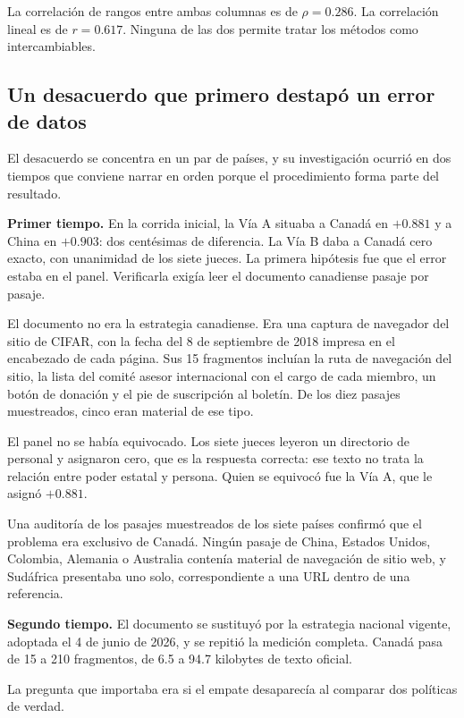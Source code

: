 La correlación de rangos entre ambas columnas es de $\rho = 0.286$. La correlación lineal es de $r = 0.617$. Ninguna de las dos permite tratar los métodos como intercambiables.

\subsection{Un desacuerdo que primero destapó un error de datos}
\label{sec:defecto-canada}

El desacuerdo se concentra en un par de países, y su investigación ocurrió en dos tiempos que conviene narrar en orden porque el procedimiento forma parte del resultado.

\textbf{Primer tiempo.} En la corrida inicial, la Vía A situaba a Canadá en $+0.881$ y a China en $+0.903$: dos centésimas de diferencia. La Vía B daba a Canadá cero exacto, con unanimidad de los siete jueces. La primera hipótesis fue que el error estaba en el panel. Verificarla exigía leer el documento canadiense pasaje por pasaje.

El documento no era la estrategia canadiense. Era una captura de navegador del sitio de CIFAR, con la fecha del 8 de septiembre de 2018 impresa en el encabezado de cada página. Sus 15 fragmentos incluían la ruta de navegación del sitio, la lista del comité asesor internacional con el cargo de cada miembro, un botón de donación y el pie de suscripción al boletín. De los diez pasajes muestreados, cinco eran material de ese tipo.

El panel no se había equivocado. Los siete jueces leyeron un directorio de personal y asignaron cero, que es la respuesta correcta: ese texto no trata la relación entre poder estatal y persona. Quien se equivocó fue la Vía A, que le asignó $+0.881$.

Una auditoría de los pasajes muestreados de los siete países confirmó que el problema era exclusivo de Canadá. Ningún pasaje de China, Estados Unidos, Colombia, Alemania o Australia contenía material de navegación de sitio web, y Sudáfrica presentaba uno solo, correspondiente a una URL dentro de una referencia.

\textbf{Segundo tiempo.} El documento se sustituyó por la estrategia nacional vigente, adoptada el 4 de junio de 2026, y se repitió la medición completa. Canadá pasa de 15 a 210 fragmentos, de 6.5 a 94.7 kilobytes de texto oficial.

La pregunta que importaba era si el empate desaparecía al comparar dos políticas de verdad.

